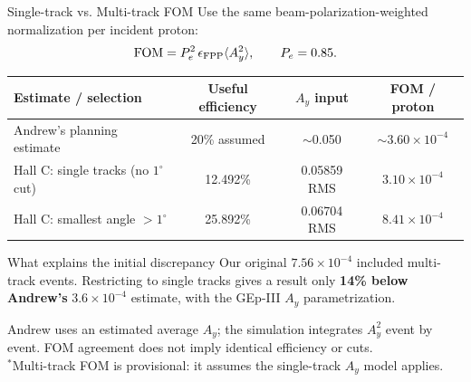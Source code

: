 \documentclass[aspectratio=169,10pt]{beamer}
\begin{document}
\begin{frame}{Single-track vs. Multi-track FOM}
  \scriptsize
  Use the same beam-polarization-weighted normalization per incident proton:
  \[
    \mathrm{FOM}=P_e^2\,\epsilon_{\rm FPP}\langle A_y^2\rangle,
    \qquad P_e=0.85.
  \]
  \vspace{-0.25cm}
  \begin{center}
    \renewcommand{\arraystretch}{1.35}
    \begin{tabular}{@{}lccc@{}}
      \toprule
      Estimate / selection & Useful efficiency & $A_y$ input & FOM / proton \\
      \midrule
      Andrew's planning estimate & 20\% assumed & $\sim$0.050 & $\sim3.60\times10^{-4}$ \\
      Hall C: single tracks (no $1^\circ$ cut) & 12.492\% & 0.05859 RMS & $3.10\times10^{-4}$ \\
      Hall C: smallest angle $>1^\circ$ & 25.892\% & 0.06704 RMS & $8.41\times10^{-4}$\rlap{$^{*}$} \\
      \bottomrule
    \end{tabular}
  \end{center}
  \vspace{-0.1cm}
  \begin{block}{What explains the initial discrepancy}
    \small
    Our original $7.56\times10^{-4}$ included multi-track events.
    Restricting to single tracks gives a result only \textbf{14\% below Andrew's}
    $3.6\times10^{-4}$ estimate, with the GEp-III $A_y$ parametrization.
  \end{block}
  {\scriptsize Andrew uses an estimated average $A_y$; the simulation integrates
  $A_y^2$ event by event. FOM agreement does not imply identical efficiency or cuts.\\[2pt]
  $^{*}$Multi-track FOM is provisional: it assumes the single-track $A_y$ model applies.}
\end{frame}
\end{document}
